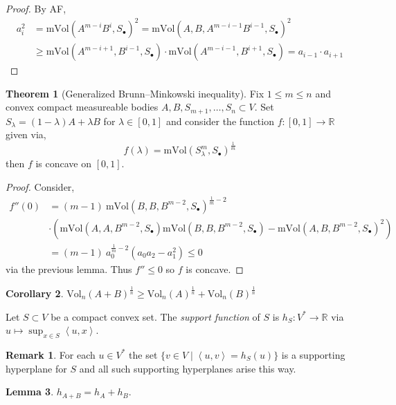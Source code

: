 \documentclass[12pt]{extarticle}
\newcommand{\R}{\mathbb{R}}
\theoremstyle{definition}
\newtheorem{theorem}{Theorem}[section]
\newtheorem{lemma}[theorem]{Lemma}
\newtheorem{corollary}[theorem]{Corollary}
\newtheorem{remark}{Remark}
\newenvironment{definition}[1][Definition:]{\begin{trivlist}
\item[\hskip \labelsep {\bfseries #1}]}{\end{trivlist}}
\newcommand{\Vol}[2]{\mathrm{Vol}_{#1}\left( #2 \right)}
\newcommand{\mVol}[1]{\mathrm{mVol}\left( #1 \right)}
\newcommand{\inner}[2]{\left< #1, #2 \right>}
\begin{document}
\begin{proof}
By AF, 
\begin{align*}
a_i^2 & = \mVol{A^{m-i} B^i, S_\bullet}^2 = \mVol{A, B, A^{m-i-1} B^{i-1}, S_\bullet}^2 
\\
& \ge \mVol{A^{m-i+1}, B^{i-1}, S_\bullet} \cdot \mVol{A^{m - i - 1}, B^{i + 1}, S_\bullet} = a_{i-1} \cdot a_{i + 1}
\end{align*}
\end{proof}

\begin{theorem}[Generalized Brunn--Minkowski inequality]
Fix $1 \le m \le n$ and convex compact measureable bodies $A, B, S_{m + 1}, \dots, S_n \subset V$. Set $S_\lambda = (1 - \lambda) A + \lambda B$ for $\lambda \in [0, 1]$ and consider the function $f : [0, 1] \to \R$ given via,
\[ f(\lambda) = \mVol{S_\lambda^m, S_\bullet}^{\frac{1}{m}} \]
then $f$ is concave on $[0, 1]$. 
\end{theorem}

\begin{proof}
Consider,
\begin{align*}
f''(0) & = (m - 1) \: \mVol{B, B, B^{m - 2}, S_\bullet}^{\frac{1}{m} - 2} 
\\
& \cdot \left( \mVol{A, A, B^{m-2}, S_\bullet} \mVol{B, B, B^{m-2}, S_\bullet} - \mVol{A, B, B^{m-2}, S_\bullet}^2 \right)
\\
& = (m - 1) \: a_0^{\frac{1}{m} - 2} \left( a_0 a_2 - a_1^2 \right) \le 0
\end{align*}
via the previous lemma. Thus $f'' \le 0$ so $f$ is concave. 
\end{proof}

\begin{corollary}
$\Vol{n}{A + B}^{\frac{1}{n}} \ge \Vol{n}{A}^{\frac{1}{n}} + \Vol{n}{B}^{\frac{1}{n}}$ 
\end{corollary}

\begin{definition}
Let $S \subset V$ be a compact convex set. The \textit{support function} of $S$ is $h_S : V^* \to \R$ via $u \mapsto \sup_{x \in S} \inner{u}{x}$. 
\end{definition}

\begin{remark}
For each $u \in V^*$ the set $\{ v \in V \mid \inner{u}{v} = h_S(u) \}$ is a supporting hyperplane for $S$ and all such supporting hyperplanes arise this way. 
\end{remark}

\begin{lemma}
$h_{A + B} = h_A + h_B$.
\end{lemma}
\end{document}
